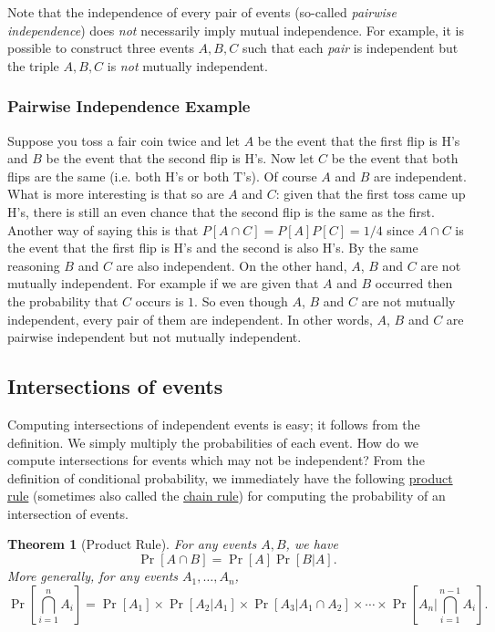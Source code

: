 \documentclass[11pt]{article}
\def\ul#1{\underline{#1}}
\newcounter{thm}
\newtheorem{theorem}{Theorem}[thm]
\begin{document}
Note that the independence of every pair of events (so-called {\it pairwise
independence\/}) does {\it not\/} necessarily imply mutual independence.
For example, it is possible to construct three events $A,B,C$ such that
each {\it pair\/} is independent but the triple $A,B,C$ is {\it not\/}
mutually independent.

\subsubsection*{Pairwise Independence Example}
Suppose you toss a fair coin twice and let $A$ be the event that the first flip is H's and
$B$ be the event that the second flip is H's. Now let $C$ be the event that both flips
are the same (i.e. both H's or both T's). Of course $A$ and $B$ are independent. 
What is more interesting is that so are $A$ and $C$: given that the first toss came up H's,
there is still an even chance that the second flip is the same as the first. Another way of 
saying this is that $P[A \cap C] = P[A]P[C] = 1/4$ since $A \cap C$ is the event that the 
first flip is H's and the second is also H's. By the same reasoning $B$ and $C$ are also
independent. On the other hand, $A$, $B$ and $C$ are not mutually independent. 
For example if we are given that $A$ and $B$ occurred then the probability that $C$ occurs
is $1$. So even though $A$, $B$ and $C$ are not mutually independent, every pair of them 
are independent. In other words, $A$, $B$ and $C$ are pairwise independent but not mutually 
independent. 

\subsection*{Intersections of events}
Computing intersections of independent events is easy; it follows from the definition. 
We simply multiply the probabilities of each event. How do we compute intersections
for events which may not be independent? From the definition of conditional probability, we immediately
have the following \ul{product rule} (sometimes also called the
\ul{chain rule}) for computing the probability
of an intersection of events.

\begin{theorem}[Product Rule] \label{thmpr}
For any events $A,B$, we have $$
   \Pr[A\cap B]= \Pr[A]\Pr[B\vert A].  $$
More generally, for any events $A_1,\ldots,A_n$, $$
   {\textstyle\Pr[\bigcap_{i=1}^n A_i] = \Pr[A_1]\times\Pr[A_2\vert A_1]\times
                                      \Pr[A_3\vert A_1\cap A_2]\times
                        \cdots\times\Pr[A_n\vert\bigcap_{i=1}^{n-1}A_i]}. $$
\end{theorem}
\end{document}
